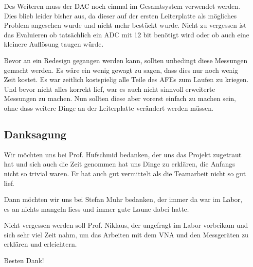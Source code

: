 Des Weiteren muss der DAC noch einmal im Gesamtsystem verwendet werden. Dies blieb leider bisher aus, da dieser auf der ersten Leiterplatte als mögliches Problem angesehen wurde und nicht mehr bestückt wurde.
Nicht zu vergessen ist das Evaluieren ob tatsächlich ein ADC mit 12 bit benötigt wird oder ob auch eine kleinere Auflösung taugen würde.

Bevor an ein Redesign gegangen werden kann, sollten unbedingt diese Messungen gemacht werden. Es wäre ein wenig gewagt zu sagen, dass dies nur noch wenig Zeit kostet. Es war zeitlich kostspielig alle Teile des AFEs zum Laufen zu kriegen. Und bevor nicht alles korrekt lief, war es auch nicht sinnvoll erweiterte Messungen zu machen. Nun sollten diese aber vorerst einfach zu machen sein, ohne dass weitere Dinge an der Leiterplatte verändert werden müssen.

\subsection*{Danksagung}

Wir möchten uns bei Prof. Hufschmid bedanken, der uns das Projekt zugetraut hat und sich auch die Zeit genommen hat uns Dinge zu erklären, die Anfangs nicht so trivial waren. Er hat auch gut vermittelt als die Teamarbeit nicht so gut lief.

Dann möchten wir uns bei Stefan Muhr bedanken, der immer da war im Labor, es an nichts mangeln liess und immer gute Laune dabei hatte.

Nicht vergessen werden soll Prof. Niklaus, der ungefragt im Labor vorbeikam und sich sehr viel Zeit nahm, um das Arbeiten mit dem VNA und den Messgeräten zu erklären und erleichtern.

Besten Dank!